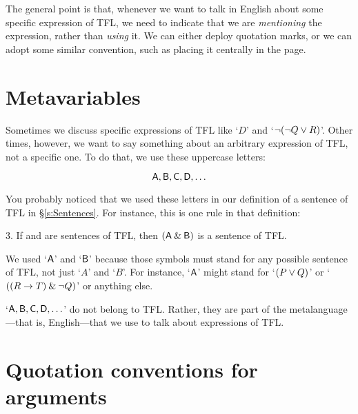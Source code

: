 The general point is that, whenever we want to talk in English about some specific expression of TFL, we need to indicate that we are \emph{mentioning} the expression, rather than \emph{using} it. We can either deploy quotation marks, or we can adopt some similar convention, such as  placing it centrally in the page. 


\section{Metavariables}\label{s:Metavariables}

Sometimes we discuss specific expressions of TFL like `$D$' and `${\neg} ({\neg} Q \vee R)$'. Other times, however, we want to say something about an arbitrary expression of TFL, not a specific one. To do that, we use these uppercase letters:
	
	$$\mathsf{A}, \mathsf{B}, \mathsf{C}, \mathsf{D}, \ldots$$
	
You probably noticed that we used these letters in our definition of a sentence of TFL in \S\ref{s:Sentences}. For instance, this is one rule in that definition:

\begin{earg}
\item[3.] If  and  are sentences of TFL, then $(\mathsf{A}\mathbin{\&}\mathsf{B})$ is a sentence of TFL.
\end{earg}

We used `$\mathsf{A}$' and `$\mathsf{B}$' because those symbols must stand for any possible sentence of TFL, not just `$A$' and `$B$'. For instance, `$\mathsf{A}$' might stand 
for `$(P \vee Q)$' or `$((R \rightarrow T) \mathbin{\&} {\neg} Q)$' or anything else.

`$\mathsf{A}, \mathsf{B}, \mathsf{C}, \mathsf{D}, \ldots$' do not belong to TFL. Rather, they are part of the metalanguage---that is, English---that we use to talk about expressions of TFL. 
	


\section{Quotation conventions for arguments}


